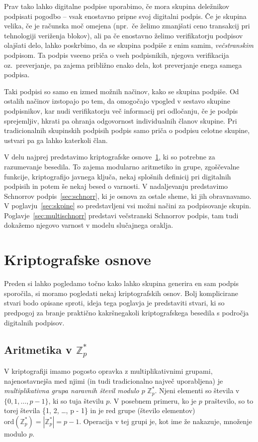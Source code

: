 \documentclass[isrm2, tisk]{fmfdelo}
\newcommand{\Z}{\mathbb Z}
\begin{document}
Prav tako lahko digitalne podpise uporabimo, če mora skupina deležnikov podpisati pogodbo -- vsak
enostavno pripne svoj digitalni podpis. Če je skupina velika, če je računska moč omejena
(npr.\ če želimo zmanjšati ceno transakcij pri tehnologiji veriženja blokov), ali pa če enostavno
želimo verifikatorju podpisov olajšati delo, lahko poskrbimo, da se skupina podpiše z enim samim,
\textit{večstranskim} podpisom. Ta podpis vseeno priča o vseh podpisnikih, njegova verifikacija oz.\
preverjanje, pa zajema približno enako dela, kot preverjanje enega samega podpisa.

Taki podpisi so samo en izmed možnih načinov, kako se skupina podpiše. Od ostalih načinov izstopajo
po tem, da omogočajo vpogled v sestavo skupine podpisnikov, kar nudi verifikatorju več informacij
pri odločanju, če je podpis sprejemljiv, hkrati pa ohranja odgovornost individualnih članov skupine.
Pri tradicionalnih skupinskih podpisih podpis samo priča o podpisu celotne skupine, ustvari pa ga
lahko katerkoli član.

V delu najprej predstavimo kriptografske osnove~\ref{sec:osnove}, ki so potrebne za razumevanje besedila.
To zajema modularno aritmetiko in grupe, zgoščevalne funkcije, kriptografijo javnega ključa, nekaj
splošnih definicij pri digitalnih podpisih in potem še nekaj besed o varnosti. V nadaljevanju predstavimo
Schnorrov podpis~\ref{sec:schnorr}, ki je osnova za ostale sheme, ki jih obravnavamo. V 
poglavju~\ref{sec:skpine} so predstavljeni vsi možni načini za podpisovanje skupin. Poglavje~\ref{sec:multischnorr}
predstavi večstranski Schnorrov podpis, tam tudi dokažemo njegovo varnost v modelu slučajnega oraklja.

\section{Kriptografske osnove}
\label{sec:osnove}
Preden si lahko pogledamo točno kako lahko skupina generira en sam podpis sporočila, si moramo 
pogledati nekaj kriptografskih osnov. Bolj komplicirane stvari bodo opisane sproti, ideja tega 
poglavja je predstaviti stvari, ki so predpogoj za branje praktično kakršnegakoli kriptografskega 
besedila s področja digitalnih podpisov.

\subsection{Aritmetika v \texorpdfstring{$\Z_p^*$}{Zp∗}}
V kriptografiji imamo pogosto opravka z multiplikativnimi grupami, najenostavnejša med njimi (in 
tudi tradicionalno največ uporabljena) je \textit{multiplikativna grupa naravnih števil modulo $p$} 
$\Z_p^*$. Njeni elementi so števila v $\{0, 1, \dots, p - 1\}$, ki so tuja številu $p$. V posebnem 
primeru, ko je $p$ praštevilo, so to torej števila \{1, 2, \dots, p - 1\} in je red grupe (število
elementov) $\text{ord}(\Z_p^*) = |\Z_p^*| = p - 1$. Operacija v tej grupi je, kot ime že nakazuje, 
množenje modulo $p$.
\end{document}

